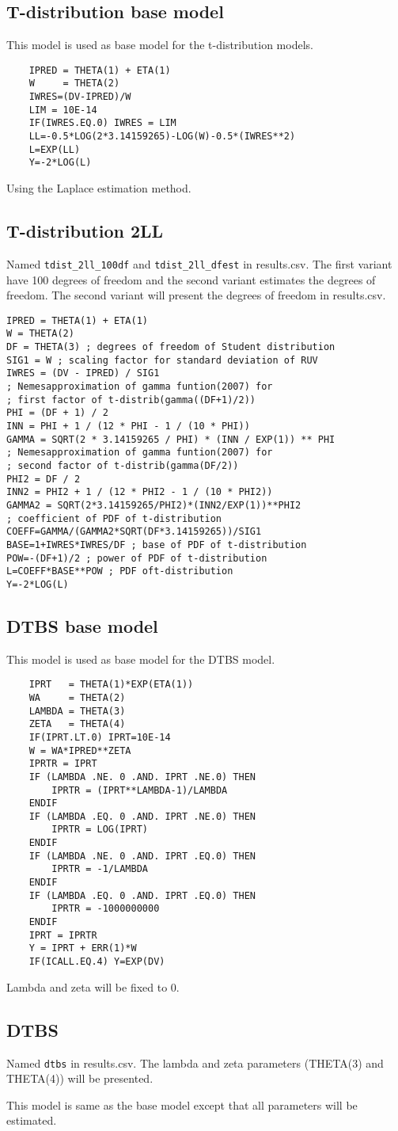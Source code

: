 \subsection{T-distribution base model}
This model is used as base model for the t-distribution models.

\begin{verbatim}
    IPRED = THETA(1) + ETA(1)
	W     = THETA(2)
	IWRES=(DV-IPRED)/W
	LIM = 10E-14
	IF(IWRES.EQ.0) IWRES = LIM
	LL=-0.5*LOG(2*3.14159265)-LOG(W)-0.5*(IWRES**2)
	L=EXP(LL)
	Y=-2*LOG(L)
\end{verbatim}

Using the Laplace estimation method.

\subsection{T-distribution 2LL}
Named \verb|tdist_2ll_100df| and \verb|tdist_2ll_dfest| in results.csv. The first variant have 100 degrees of freedom and the second variant estimates the degrees of freedom. The second variant will present the degrees of freedom in results.csv.

\begin{verbatim}
IPRED = THETA(1) + ETA(1)
W = THETA(2)
DF = THETA(3) ; degrees of freedom of Student distribution
SIG1 = W ; scaling factor for standard deviation of RUV
IWRES = (DV - IPRED) / SIG1
; Nemesapproximation of gamma funtion(2007) for
; first factor of t-distrib(gamma((DF+1)/2))
PHI = (DF + 1) / 2
INN = PHI + 1 / (12 * PHI - 1 / (10 * PHI))
GAMMA = SQRT(2 * 3.14159265 / PHI) * (INN / EXP(1)) ** PHI
; Nemesapproximation of gamma funtion(2007) for
; second factor of t-distrib(gamma(DF/2))
PHI2 = DF / 2
INN2 = PHI2 + 1 / (12 * PHI2 - 1 / (10 * PHI2))
GAMMA2 = SQRT(2*3.14159265/PHI2)*(INN2/EXP(1))**PHI2
; coefficient of PDF of t-distribution
COEFF=GAMMA/(GAMMA2*SQRT(DF*3.14159265))/SIG1
BASE=1+IWRES*IWRES/DF ; base of PDF of t-distribution
POW=-(DF+1)/2 ; power of PDF of t-distribution
L=COEFF*BASE**POW ; PDF oft-distribution
Y=-2*LOG(L)
\end{verbatim}

\subsection{DTBS base model}
This model is used as base model for the DTBS model.
\begin{verbatim}
    IPRT   = THETA(1)*EXP(ETA(1))
	WA     = THETA(2)
	LAMBDA = THETA(3)
	ZETA   = THETA(4)
	IF(IPRT.LT.0) IPRT=10E-14
	W = WA*IPRED**ZETA
	IPRTR = IPRT
	IF (LAMBDA .NE. 0 .AND. IPRT .NE.0) THEN
		IPRTR = (IPRT**LAMBDA-1)/LAMBDA
	ENDIF
	IF (LAMBDA .EQ. 0 .AND. IPRT .NE.0) THEN
		IPRTR = LOG(IPRT)
	ENDIF
	IF (LAMBDA .NE. 0 .AND. IPRT .EQ.0) THEN
		IPRTR = -1/LAMBDA
	ENDIF
	IF (LAMBDA .EQ. 0 .AND. IPRT .EQ.0) THEN
		IPRTR = -1000000000
	ENDIF
	IPRT = IPRTR
	Y = IPRT + ERR(1)*W
	IF(ICALL.EQ.4) Y=EXP(DV)
\end{verbatim}

Lambda and zeta will be fixed to 0.

\subsection{DTBS}
Named \verb|dtbs| in results.csv. The lambda and zeta parameters (THETA(3) and THETA(4)) will be presented.

This model is same as the base model except that all parameters will be estimated.


